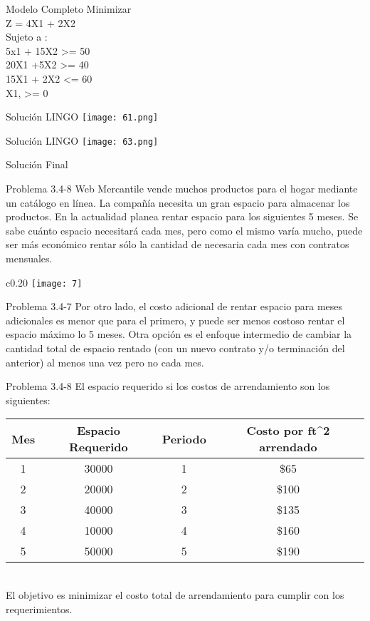 \documentclass{beamer}
\begin{document}
\begin{frame}[fragile]{Modelo Completo}
Minimizar\\
Z = 4X1 + 2X2\\
Sujeto a :\\
5x1 + 15X2 >= 50\\
20X1 +5X2 >= 40\\
15X1 + 2X2 <= 60\\
X1, >= 0\\
\end{frame}

\begin{frame}[fragile]{Solución LINGO}
    \texttt{[image: 61.png]}
\end{frame}
\begin{frame}[fragile]{Solución LINGO}
    \texttt{[image: 63.png]}
\end{frame}

\begin{frame}[fragile]{Solución Final}
\end{frame}

\begin{frame}[t,fragile]{Problema 3.4-8 }
Web Mercantile vende muchos productos para el hogar mediante un catálogo en línea. La compañía  necesita un gran espacio para almacenar los productos. En la actualidad planea rentar espacio para los siguientes 5 meses. Se sabe cuánto espacio necesitará cada mes, pero como el mismo varía mucho, puede ser más económico rentar sólo la cantidad  de necesaria cada mes con contratos mensuales.
\begin{wrapfigure}{c}{0.20\textwidth}
    \centering
    \texttt{[image: 7]}
\end{wrapfigure}
\end{frame}
\begin{frame}[t,fragile]{Problema 3.4-7}
Por otro lado, el costo adicional de rentar espacio para meses adicionales es menor que para el primero, y puede ser menos costoso rentar el espacio máximo lo 5 meses. Otra opción es el enfoque intermedio de cambiar la cantidad total de  espacio rentado (con un nuevo contrato y/o terminación del anterior) al menos una vez pero no cada mes.
\end{frame}

\begin{frame}[t,fragile]{Problema 3.4-8 }
El espacio requerido si los costos de arrendamiento son los siguientes:
\begin{tabular}{|c|c|c|c|}
\hline 
Mes & Espacio Requerido & Periodo & Costo por ft^2 arrendado \\ 
\hline 
1 & 30000 & 1 & \$65 \\ 
\hline 
2 & 20000 & 2 & \$100 \\ 
\hline 
3 & 40000 & 3 & \$135 \\ 
\hline 
4 & 10000 & 4 & \$160 \\ 
\hline 
5 & 50000 & 5 & \$190 \\ 
\hline 
\end{tabular} \\
El objetivo es minimizar el costo total de arrendamiento para cumplir con los requerimientos.
\end{frame}
\end{document}
